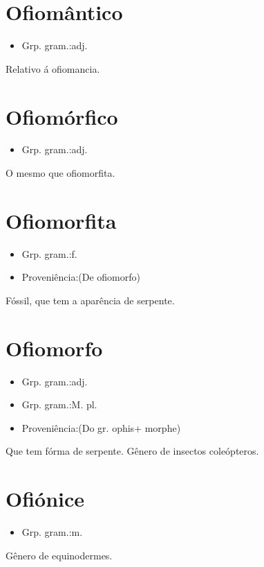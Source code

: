 \section{Ofiomântico}
\begin{itemize}
\item {Grp. gram.:adj.}
\end{itemize}
Relativo á ofiomancia.
\section{Ofiomórfico}
\begin{itemize}
\item {Grp. gram.:adj.}
\end{itemize}
O mesmo que \textunderscore ofiomorfita\textunderscore .
\section{Ofiomorfita}
\begin{itemize}
\item {Grp. gram.:f.}
\end{itemize}
\begin{itemize}
\item {Proveniência:(De \textunderscore ofiomorfo\textunderscore )}
\end{itemize}
Fóssil, que tem a aparência de serpente.
\section{Ofiomorfo}
\begin{itemize}
\item {Grp. gram.:adj.}
\end{itemize}
\begin{itemize}
\item {Grp. gram.:M. pl.}
\end{itemize}
\begin{itemize}
\item {Proveniência:(Do gr. \textunderscore ophis\textunderscore  + \textunderscore morphe\textunderscore )}
\end{itemize}
Que tem fórma de serpente.
Gênero de insectos coleópteros.
\section{Ofiónice}
\begin{itemize}
\item {Grp. gram.:m.}
\end{itemize}
Gênero de equinodermes.
